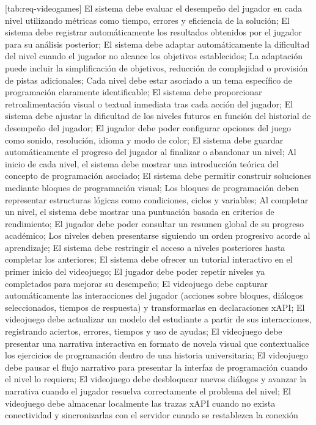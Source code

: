 [tab:req-videogames]{
	El sistema debe evaluar el desempeño del jugador en cada nivel utilizando métricas como tiempo, errores y eficiencia de la solución;
	El sistema debe registrar automáticamente los resultados obtenidos por el jugador para su análisis posterior;
	El sistema debe adaptar automáticamente la dificultad del nivel cuando el jugador no alcance los objetivos establecidos;
	La adaptación puede incluir la simplificación de objetivos, reducción de complejidad o provisión de pistas adicionales;
	Cada nivel debe estar asociado a un tema específico de programación claramente identificable;
	El sistema debe proporcionar retroalimentación visual o textual inmediata tras cada acción del jugador;
	El sistema debe ajustar la dificultad de los niveles futuros en función del historial de desempeño del jugador;
	El jugador debe poder configurar opciones del juego como sonido, resolución, idioma y modo de color;
	El sistema debe guardar automáticamente el progreso del jugador al finalizar o abandonar un nivel;
	Al inicio de cada nivel, el sistema debe mostrar una introducción teórica del concepto de programación asociado;
	El sistema debe permitir construir soluciones mediante bloques de programación visual;
	Los bloques de programación deben representar estructuras lógicas como condiciones, ciclos y variables;
	Al completar un nivel, el sistema debe mostrar una puntuación basada en criterios de rendimiento;
	El jugador debe poder consultar un resumen global de su progreso académico;
	Los niveles deben presentarse siguiendo un orden progresivo acorde al aprendizaje;
	El sistema debe restringir el acceso a niveles posteriores hasta completar los anteriores;
	El sistema debe ofrecer un tutorial interactivo en el primer inicio del videojuego;
	El jugador debe poder repetir niveles ya completados para mejorar su desempeño;
	El videojuego debe capturar automáticamente las interacciones del jugador (acciones sobre bloques, diálogos seleccionados, tiempos de respuesta) y transformarlas en declaraciones xAPI;
	El videojuego debe actualizar un modelo del estudiante a partir de sus interacciones, registrando aciertos, errores, tiempos y uso de ayudas;
	El videojuego debe presentar una narrativa interactiva en formato de novela visual que contextualice los ejercicios de programación dentro de una historia universitaria;
	El videojuego debe pausar el flujo narrativo para presentar la interfaz de programación cuando el nivel lo requiera;
	El videojuego debe desbloquear nuevos diálogos y avanzar la narrativa cuando el jugador resuelva correctamente el problema del nivel;
	El videojuego debe almacenar localmente las trazas xAPI cuando no exista conectividad y sincronizarlas con el servidor cuando se restablezca la conexión
}


